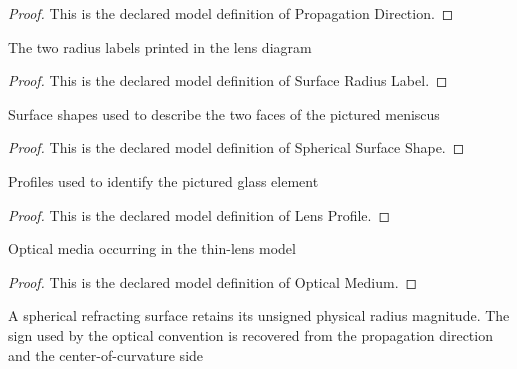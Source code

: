 \begin{proof}
  This is the declared model definition of Propagation Direction.
\end{proof}
\begin{definition}
  \label{def:physics:phyx-mini-0056:phyxminiproblems-problemphyxmini0056-surfaceradiuslabel}
  The two radius labels printed in the lens diagram
\end{definition}
\begin{proof}
  This is the declared model definition of Surface Radius Label.
\end{proof}
\begin{definition}
  \label{def:physics:phyx-mini-0056:phyxminiproblems-problemphyxmini0056-sphericalsurfaceshape}
  Surface shapes used to describe the two faces of the pictured meniscus
\end{definition}
\begin{proof}
  This is the declared model definition of Spherical Surface Shape.
\end{proof}
\begin{definition}
  \label{def:physics:phyx-mini-0056:phyxminiproblems-problemphyxmini0056-lensprofile}
  Profiles used to identify the pictured glass element
\end{definition}
\begin{proof}
  This is the declared model definition of Lens Profile.
\end{proof}
\begin{definition}
  \label{def:physics:phyx-mini-0056:phyxminiproblems-problemphyxmini0056-opticalmedium}
  Optical media occurring in the thin-lens model
\end{definition}
\begin{proof}
  This is the declared model definition of Optical Medium.
\end{proof}
\begin{definition}
  \label{def:physics:phyx-mini-0056:phyxminiproblems-problemphyxmini0056-sphericallenssurface}
  A spherical refracting surface retains its unsigned physical radius magnitude. The sign used by the optical convention is recovered from the propagation direction and the center-of-curvature side
\end{definition}

